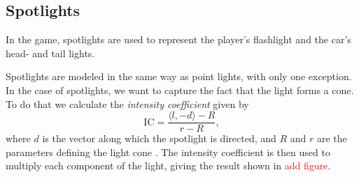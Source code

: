 \subsection{Spotlights}
In the game, spotlights are used to represent the player's flashlight and the car's head- and tail lights.

Spotlights are modeled in the same way as point lights, with only one exception.
In the case of spotlights, we want to capture the fact that the light forms a cone.
To do that we calculate the \textit{intensity coefficient} given by
\begin{equation*}
    \mathrm{IC} = \frac{\langle l, -d \rangle - R}{r - R},
\end{equation*}
where $d$ is the vector along which the spotlight is directed, and $R$ and $r$ are the parameters defining the light cone \cite{LearnOpenGL-Light-casters}.
The intensity coefficient is then used to multiply each component of the light, giving the result shown in \textcolor{red}{add figure}.